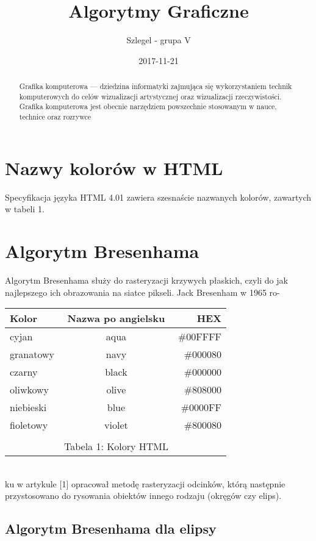 \documentclass{article}
\title{Algorytmy Graficzne}
\author{Szlegel - grupa V}
\date{2017-11-21}
\begin{document}
\maketitle
\begin{abstract}
Grafika komputerowa — dziedzina informatyki zajmująca się wykorzystaniem
technik komputerowych do celów wizualizacji artystycznej
oraz wizualizacji rzeczywistości. Grafika komputerowa jest obecnie
narzędziem powszechnie stosowanym w nauce, technice oraz rozrywce

\end{abstract}

\tableofcontents

\section{Nazwy kolorów w HTML}
Specyfikacja języka HTML 4.01 zawiera szesnaście nazwanych kolorów, zawartych
w tabeli 1.

\section{Algorytm Bresenhama}
Algorytm Bresenhama służy do rasteryzacji krzywych płaskich, czyli do jak
najlepszego ich obrazowania na siatce pikseli. Jack Bresenham w 1965 ro-\\

\begin{tabular}{l c r}
\bfseries Kolor & \bfseries{Nazwa po angielsku} & \bfseries HEX\\ \hline
cyjan & aqua & \#00FFFF \\
granatowy & navy & \#000080 \\
czarny & black & \#000000 \\
oliwkowy & olive & \#808000 \\
niebieski & blue & \#0000FF \\
fioletowy & violet & \#800080 \\ \hline 
\\ & Tabela 1: Kolory HTML
\end{tabular} \newline \\
ku w artykule [1] opracował metodę rasteryzacji odcinków, którą następnie
przystosowano do rysowania obiektów innego rodzaju (okręgów czy elips).

\subsection{Algorytm Bresenhama dla elipsy}
\end{document}
